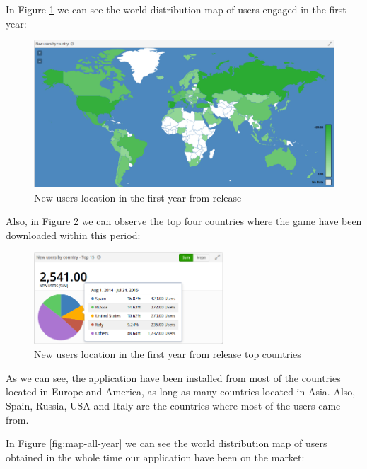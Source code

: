 \FloatBarrier

In Figure \ref{fig:map-first-year} we can see the world distribution map of users engaged in the first year:

\begin{figure}[h]
\centering
\includegraphics[width=350pt]{graphics/evaluation/map_users_year.png}
\caption{New users location in the first year from release}
\label{fig:map-first-year}
\end{figure}

Also, in Figure \ref{fig:chart-first-year} we can observe the top four countries where the game have been downloaded within this period:

\begin{figure}[h]
\centering
\includegraphics[width=200pt]{graphics/evaluation/chart_users_year.png}
\caption{New users location in the first year from release top countries}
\label{fig:chart-first-year}
\end{figure}

\FloatBarrier

As we can see, the application have been installed from most of the countries located in Europe and America, as long as many countries located in Asia. Also, Spain, Russia, USA and Italy are the countries where most of the users came from.

In Figure \ref{fig:map-all-year} we can see the world distribution map of users obtained in the whole time our application have been on the market:

